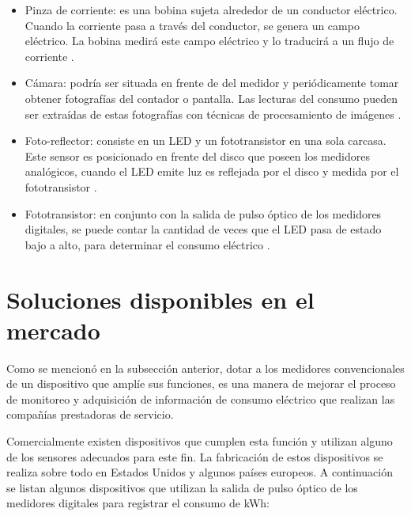 \begin{itemize}
	\item Pinza de corriente: es una bobina sujeta alrededor de un conductor eléctrico. Cuando la corriente pasa a través del conductor, se genera un campo eléctrico. La bobina medirá este campo eléctrico y lo traducirá  a un flujo de corriente \citep{WEBSITE:3}.
	\item Cámara: podría ser situada en frente de del medidor y periódicamente tomar obtener fotografías del contador o pantalla. Las lecturas del consumo pueden ser extraídas de estas fotografías con técnicas de procesamiento de imágenes \citep{ARTICLE:1}.
	\item Foto-reflector: consiste en un LED y un fototransistor en una sola carcasa. Este sensor es posicionado en frente del disco que poseen los medidores analógicos, cuando el LED emite luz es reflejada por el disco y medida por el fototransistor \citep{WEBSITE:4}.
	\item Fototransistor: en conjunto con la salida de pulso óptico de los medidores digitales, se puede contar la cantidad de veces que el LED pasa de estado bajo a alto, para determinar el consumo eléctrico \citep{WEBSITE:5}.
\end{itemize}


\section{Soluciones disponibles en el mercado}

Como se mencionó en la subsección anterior, dotar a los medidores convencionales de un dispositivo que amplíe sus funciones, es una manera de mejorar el proceso de monitoreo y adquisición de información de consumo eléctrico que realizan las compañías prestadoras de servicio.

Comercialmente existen dispositivos que cumplen esta función y utilizan alguno de los sensores adecuados para este fin. La fabricación de estos dispositivos se realiza sobre todo en Estados Unidos y algunos países europeos. A continuación se listan algunos dispositivos que utilizan la salida de pulso óptico de los medidores digitales para registrar el consumo de kWh:

